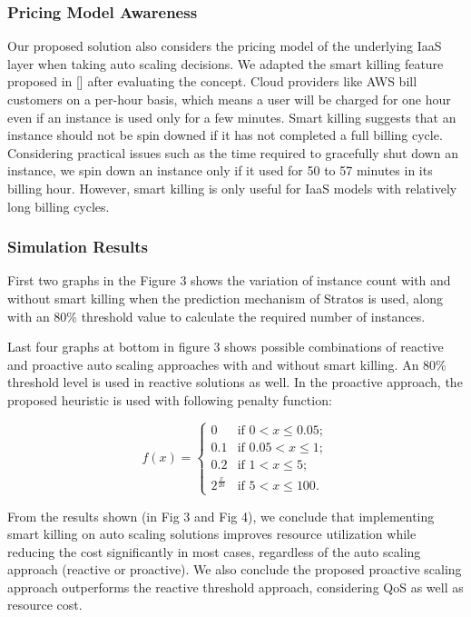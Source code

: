 \subsubsection {Pricing Model Awareness}

Our proposed solution also considers the pricing model of the underlying IaaS layer when taking auto scaling decisions. We adapted the smart killing feature proposed in [\cite{pluggable}] after evaluating the concept. Cloud providers like AWS bill customers on a per-hour basis, which means a user will be charged for one hour even if an instance is used only for a few minutes. Smart killing suggests that an instance should not be spin downed if it has not completed a full billing cycle. Considering practical issues such as the time required to gracefully shut down an instance, we spin down an instance only if it used for 50 to 57 minutes in its billing hour. However, smart killing is only useful for IaaS models with relatively long billing cycles.

\subsubsection{Simulation Results}
First two graphs in the Figure 3 shows the variation of instance count with and without smart killing when the prediction mechanism of Stratos is used, along with an 80\% threshold value to calculate the required number of instances.

Last four graphs at bottom in figure 3 shows possible combinations of reactive and proactive auto scaling approaches with and without smart killing. An 80\% threshold level is used in reactive solutions as well. In the proactive approach, the proposed heuristic is used with following penalty function:

$$f(x) = \begin{cases} 
0 & \text{if $0 < x \le 0.05$}; \\
0.1 & \text{if $0.05 < x \le 1$}; \\
0.2 & \text{if $1 < x \le 5$};\\
2^{\frac{x}{20}} & \text{if $5 < x \le 100$}.\end{cases} $$

From the results shown (in Fig 3 and Fig 4), we conclude that implementing smart killing on auto scaling solutions improves resource utilization while reducing the cost significantly in most cases, regardless of the auto scaling approach (reactive or proactive). We also conclude the proposed proactive scaling approach outperforms the reactive threshold approach, considering QoS as well as resource cost.

